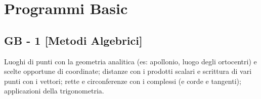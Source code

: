 \section{Programmi Basic}

\subsection{GB - 1 [Metodi Algebrici]}
\begin{short}
 Luoghi di punti con la geometria analitica (es: apollonio, luogo degli ortocentri) e scelte opportune di coordinate; distanze con i prodotti scalari e scrittura di vari punti con i vettori; rette e circonferenze con i complessi (e corde e tangenti); applicazioni della trigonometria.
\end{short}



